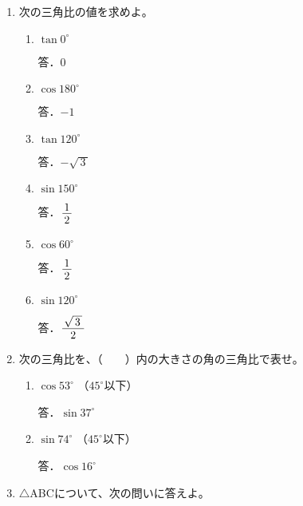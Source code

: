 \documentclass[b4paper,twocolumn]{jsarticle}
\def\nfrac#1#2{%
\displaystyle \frac{\lower.44ex\hbox{$\,#1\,$}}{\lower-.1ex\hbox{$\,#2\,$}}}%
\begin{document}
\newpage


\begin{enumerate}
\item 次の三角比の値を求めよ。

\begin{enumerate}
\item $\tan 0^\circ $
\vfill

\hfill 答．$0$

\item $\cos 180^\circ $
\vfill

\hfill 答．$-1$

\item $\tan 120^\circ $
\vfill

\hfill 答．$-\sqrt{\,3\,}$

\item $\sin 150^\circ $
\vfill

\hfill 答．$\nfrac{1}{2}$

\item $\cos 60^\circ $
\vfill

\hfill 答．$\nfrac{1}{2}$

\item $\sin 120^\circ $
\vfill

\hfill 答．$\nfrac{\sqrt{\,3\,}}{2}$

\end{enumerate}

\item 次の三角比を、（　　）内の大きさの角の三角比で表せ。

\begin{enumerate}
\item $\cos 53^\circ$ \hfill （$45^\circ$以下） \hspace{30truemm}
\vfill

\hfill 答．$\sin 37^\circ$

\item $\sin 74^\circ$ \hfill （$45^\circ$以下） \hspace{30truemm}
\vfill

\hfill 答．$\cos 16^\circ$

\end{enumerate}

\newpage
\item $\triangle$ABCについて、次の問いに答えよ。


\end{enumerate}
\end{document}
